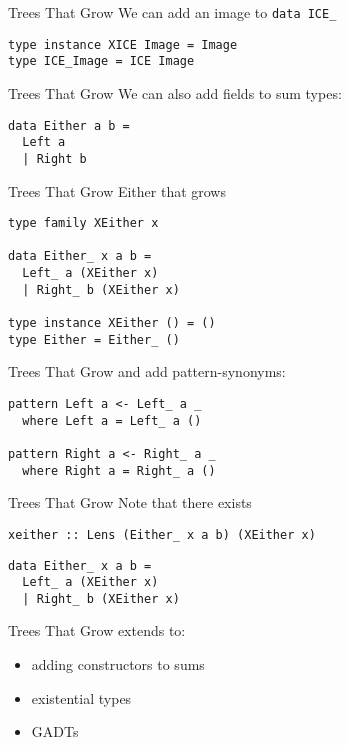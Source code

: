 \begin{frame}[fragile]
\begin{block}{Trees That Grow}
We can add an image to \lstinline{data ICE_}
\begin{lstlisting}[style=haskell]
type instance XICE Image = Image
type ICE_Image = ICE Image
\end{lstlisting}
\end{block}
\end{frame}

\begin{frame}[fragile]
\begin{block}{Trees That Grow}
We can also add fields to sum types:
\begin{lstlisting}[style=haskell]
data Either a b =
  Left a
  | Right b
\end{lstlisting}
\end{block}
\end{frame}

\begin{frame}[fragile]
\begin{block}{Trees That Grow}
Either that grows
\begin{lstlisting}[style=haskell]
type family XEither x

data Either_ x a b =
  Left_ a (XEither x)
  | Right_ b (XEither x)

type instance XEither () = ()
type Either = Either_ ()
\end{lstlisting}
\end{block}
\end{frame}

\begin{frame}[fragile]
\begin{block}{Trees That Grow}
and add pattern-synonyms:
\begin{lstlisting}[style=haskell]
pattern Left a <- Left_ a _
  where Left a = Left_ a ()

pattern Right a <- Right_ a _
  where Right a = Right_ a ()
\end{lstlisting}
\end{block}
\end{frame}
 
\begin{frame}[fragile]
\begin{block}{Trees That Grow}
Note that there exists
\begin{lstlisting}[style=haskell]
xeither :: Lens (Either_ x a b) (XEither x)
\end{lstlisting}
\begin{lstlisting}[style=haskell]
data Either_ x a b =
  Left_ a (XEither x)
  | Right_ b (XEither x)
\end{lstlisting}
\end{block}
\end{frame}

\begin{frame}[fragile]
\begin{center}
Trees That Grow extends to:\cite{najd2016trees}
\begin{itemize}
\item adding constructors to sums
\item existential types
\item GADTs
\end{itemize}
\end{center}
\end{frame}
